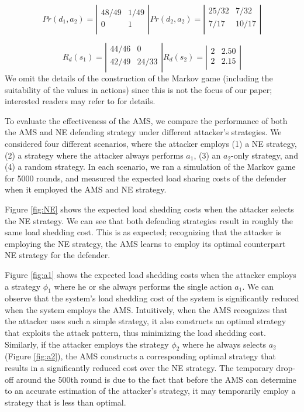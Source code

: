 \[ Pr(d_1,a_2) = \left| \begin{array}{cc}
 48/49 & 1/49  \\
 0 & 1  \\ \end{array} \right|
 Pr(d_2,a_2) = \left| \begin{array}{cc}
 25/32 & 7/32\\
 7/17 & 10/17  \\ \end{array} \right|\]

\[ R_d(s_1) = \left| \begin{array}{cc}
 44/46 & 0  \\
 42/49 & 24/33  \\ \end{array} \right|
 R_d(s_2) = \left| \begin{array}{cc}
 2 & 2.50  \\
 2 & 2.15  \\ \end{array} \right|\]
We omit the details of the construction of the Markov game (including the suitability of the values in actions) since this is not the focus of our paper; interested readers may refer to \cite{law2012security} for details.

To evaluate the effectiveness of the AMS, we compare the performance of both the AMS and NE defending strategy under different attacker's strategies. We considered four different scenarios, where the attacker employs (1) a NE strategy, (2) a strategy where the attacker always performs $a_1$, (3) an $a_2$-only strategy, and (4) a random strategy. In each scenario, we ran a simulation of the Markov game for 5000 rounds, and measured the expected load sharing costs of the defender when it employed the AMS and NE strategy.

Figure \ref{fig:NE} shows the expected load shedding costs when the attacker selects the NE strategy. We can see that both defending strategies result in roughly the same load shedding cost. This is as expected; recognizing that the attacker is employing the NE strategy, the AMS learns to employ its optimal counterpart NE strategy for the defender.

Figure \ref{fig:a1} shows the expected load shedding costs when the attacker employs a strategy $\phi_1$ where he or she always performs the single action $a_1$. We can observe that the system's load shedding cost of the system is significantly reduced when the system employs the AMS. Intuitively, when the AMS recognizes that the attacker uses such a simple strategy, it also constructs an optimal strategy that exploits the attack pattern, thus minimizing the load shedding cost. Similarly, if the attacker employs the strategy $\phi_2$ where he always selects $a_2$ (Figure \ref{fig:a2}), the AMS constructs a corresponding optimal strategy that results in a significantly reduced cost over the NE strategy. The temporary drop-off around the 500th round is due to the fact that before the AMS can determine to an accurate estimation of the attacker's strategy, it may temporarily employ a strategy that is less than optimal. 

